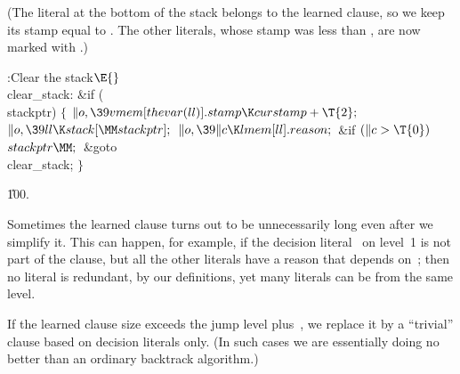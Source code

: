 (The literal at the bottom of the stack belongs to the learned clause,
so we keep its stamp equal to . The other literals, whose
stamp was less than , are now marked with .)

\Y\B\4:Clear the stack\X${}\E{}$\6
\4\\{clear\_stack}:\5
\&{if} (\\{stackptr})\5
${}\{{}$\1\6
${}\|o,\39\\{vmem}[\\{thevar}(\\{ll})].\\{stamp}\K\\{curstamp}+\T{2};{}$\6
${}\|o,\39\\{ll}\K\\{stack}[\MM\\{stackptr}];{}$\6
${}\|o,\39\|c\K\\{lmem}[\\{ll}].\\{reason};{}$\6
\&{if} ${}(\|c>\T{0}){}$\1\5
${}\\{stackptr}\MM;{}$\2\6
\&{goto} \\{clear\_stack};\6
\4${}\}{}$\2\par
\U100.\fi

Sometimes the learned clause turns out to be unnecessarily
long even
after we simplify it. This can happen, for example, if the decision
literal~ on level~1 is not part of the clause, but all the other
literals
have a reason that depends on~; then no literal is redundant, by our
definitions, yet many literals can be from the same level.

If the learned clause size exceeds the jump level plus~,
we
replace it
by a ``trivial'' clause based on decision literals only. (In such cases
we are essentially doing no better than an ordinary backtrack algorithm.)

